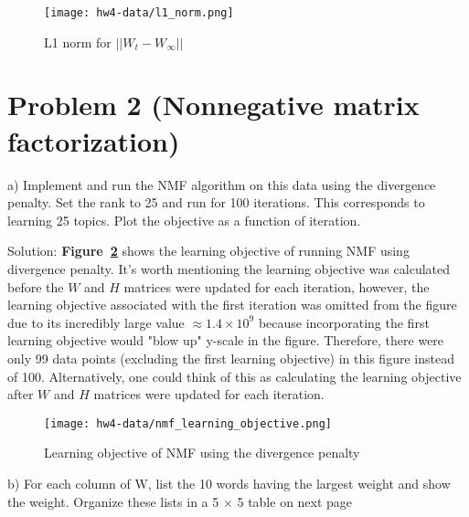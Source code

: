 \documentclass[11pt]{report}
\begin{document}
\begin{figure}[h]
\texttt{[image: hw4-data/l1\_norm.png]}
\centering
\caption{L1 norm for $||W_{t} - W_{\infty}||$ }
\label{fig:l1_norm}
\end{figure}


\pagebreak

\section* {Problem 2 (Nonnegative matrix factorization)}
a) Implement and run the NMF algorithm on this data using the divergence penalty. Set the rank to 25 and run for 100 iterations. This corresponds to learning 25 topics. Plot the objective as a function of iteration.

\justify Solution: \textbf{Figure~\ref{fig:nmf_learning_objective}} shows the learning objective of running NMF using divergence penalty. It's worth mentioning the learning objective was calculated before the $W$ and $H$ matrices were updated for each iteration, however, the learning objective associated with the first iteration was omitted from the figure due to its incredibly large value  $\approx 1.4 \times 10^{9}$ because incorporating the first learning objective would "blow up" y-scale in the figure. Therefore, there were only 99 data points (excluding the first learning objective) in this figure instead of 100. Alternatively, one could think of this as calculating the learning objective after $W$ and $H$ matrices were updated for each iteration.

\begin{figure}[h]
\texttt{[image: hw4-data/nmf\_learning\_objective.png]}
\centering
\caption{Learning objective of NMF using the divergence penalty}
\label{fig:nmf_learning_objective}
\end{figure}

\justify b) For each column of W, list the 10 words having the largest weight and show the weight. Organize these lists in a 5 $\times$ 5 table on next page
\end{document}
